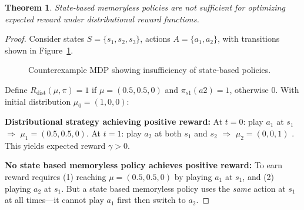 \documentclass{article}
\newtheorem{theorem}{Theorem}
\begin{document}
\begin{theorem}\label{thm:markov-insufficient} 
State-based memoryless policies are not sufficient for optimizing expected reward under distributional reward functions.
\end{theorem} 

\begin{proof}  
Consider states $S = \{s_1, s_2, s_3\}$, actions $A = \{a_1, a_2\}$, with transitions shown in Figure~\ref{fig:counterexample}.

\begin{figure}[h]
\centering
{}
\caption{Counterexample MDP showing insufficiency of state-based policies.}
\label{fig:counterexample}
\end{figure}

Define $R_{\text{dist}}(\mu, \pi) = 1$ if $\mu = (0.5, 0.5,0)$  and $\pi_{s1}(a2) = 1 $, otherwise $0$. With initial distribution $\mu_0 = (1, 0, 0)$:

\textbf{Distributional strategy achieving positive reward:} At $t=0$: play $a_1$ at $s_1$ $\Rightarrow$ $\mu_1 = (0.5, 0.5, 0)$. At $t=1$: play $a_2$ at both $s_1$ and $s_2$ $\Rightarrow$ $\mu_2 = (0, 0, 1)$  . This yields expected reward $\gamma  > 0$.

\textbf{No state based memoryless policy achieves positive reward:} To earn reward requires (1) reaching $\mu = (0.5, 0.5, 0)$ by playing $a_1$ at $s_1$, and (2)  playing $a_2$ at $s_1$. But a state based memoryless policy uses the \emph{same} action at $s_1$ at all times—it cannot play $a_1$ first then switch to $a_2$.
\end{proof}
\end{document}
